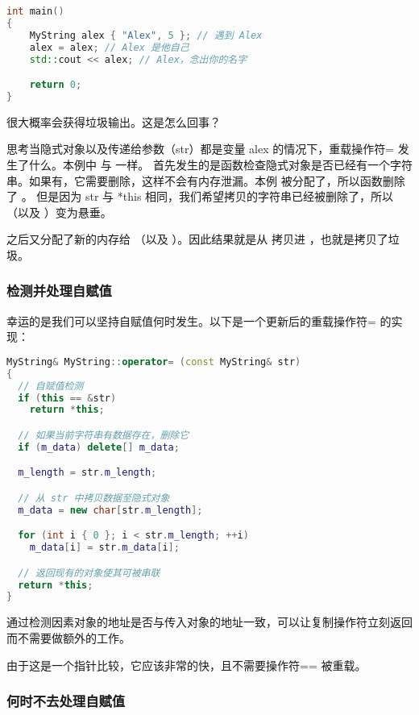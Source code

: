 \documentclass[../../LearnCpp.tex]{subfiles}
\begin{document}
\begin{lstlisting}[language=C++]
int main()
{
    MyString alex { "Alex", 5 }; // 遇到 Alex
    alex = alex; // Alex 是他自己
    std::cout << alex; // Alex，念出你的名字

    return 0;
}
\end{lstlisting}

很大概率会获得垃圾输出。这是怎么回事？

思考当隐式对象以及传递给参数（str）都是变量 alex 的情况下，重载操作符= 发生了什么。本例中  与  一样。
首先发生的是函数检查隐式对象是否已经有一个字符串。如果有，它需要删除，这样不会有内存泄漏。本例  被分配了，所以函数删除了 。
但是因为 str 与 *this 相同，我们希望拷贝的字符串已经被删除了，所以 （以及 ）变为悬垂。

之后又分配了新的内存给 （以及 ）。因此结果就是从  拷贝进 ，也就是拷贝了垃圾。

\subsubsection*{检测并处理自赋值}

幸运的是我们可以坚持自赋值何时发生。以下是一个更新后的重载操作符= 的实现：

\begin{lstlisting}[language=C++]
MyString& MyString::operator= (const MyString& str)
{
  // 自赋值检测
  if (this == &str)
    return *this;

  // 如果当前字符串有数据存在，删除它
  if (m_data) delete[] m_data;

  m_length = str.m_length;

  // 从 str 中拷贝数据至隐式对象
  m_data = new char[str.m_length];

  for (int i { 0 }; i < str.m_length; ++i)
    m_data[i] = str.m_data[i];

  // 返回现有的对象使其可被串联
  return *this;
}
\end{lstlisting}

通过检测因素对象的地址是否与传入对象的地址一致，可以让复制操作符立刻返回而不需要做额外的工作。

由于这是一个指针比较，它应该非常的快，且不需要操作符== 被重载。

\subsubsection*{何时不去处理自赋值}
\end{document}
